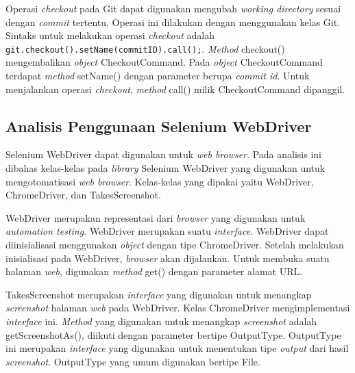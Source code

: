 Operasi \textit{checkout} pada Git dapat digunakan mengubah \textit{working directory} sesuai dengan \textit{commit} tertentu. Operasi ini dilakukan dengan menggunakan kelas Git. Sintaks untuk melakukan operasi \textit{checkout} adalah \texttt{git.checkout().setName(commitID).call();}. \textit{Method} checkout() mengembalikan \textit{object} CheckoutCommand. Pada \textit{object} CheckoutCommand terdapat \textit{method} setName() dengan parameter berupa \textit{commit id}. Untuk menjalankan operasi \textit{checkout}, \textit{method} call() milik CheckoutCommand dipanggil.  
 

\subsection{Analisis Penggunaan Selenium WebDriver}
\label{subsec:analisis_selenium}
Selenium WebDriver dapat digunakan untuk \textit{web browser}. Pada analisis ini dibahas kelas-kelas pada \textit{library} Selenium WebDriver yang digunakan untuk mengotomatisasi \textit{web browser}. 
Kelas-kelas yang dipakai yaitu WebDriver, ChromeDriver, dan TakesScreenshot.

WebDriver merupakan representasi dari \textit{browser} yang digunakan untuk \textit{automation testing}. WebDriver merupakan suatu \textit{interface}. WebDriver dapat diinisialisasi menggunakan \textit{object} dengan tipe ChromeDriver. Setelah melakukan inisialisasi pada WebDriver, \textit{browser} akan dijalankan. Untuk membuka suatu halaman \textit{web}, digunakan \textit{method} get() dengan parameter alamat URL. 

TakesScreenshot merupakan \textit{interface} yang digunakan untuk menangkap \textit{screenshot} halaman \textit{web} pada WebDriver. Kelas ChromeDriver mengimplementasi \textit{interface} ini. \textit{Method} yang digunakan untuk menangkap \textit{screenshot} adalah getScreenshotAs(), diikuti dengan parameter bertipe OutputType. OutputType ini merupakan \textit{interface} yang digunakan untuk menentukan tipe \textit{output} dari hasil \textit{screenshot}. OutputType yang umum digunakan bertipe File.    

